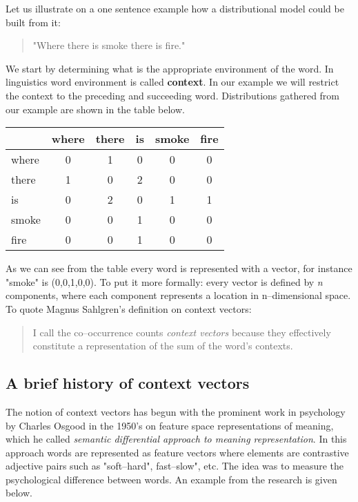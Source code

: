 Let us illustrate on a one sentence example how a distributional model could be built from it: 
\begin{quotation}
"Where there is smoke there is fire."
\end{quotation}
We start by determining what is the appropriate environment of the word. In linguistics word environment is called \textbf{context}. In our example we will restrict the context to the preceding and succeeding word. Distributions gathered from our example are shown in the table below. 
\\
\begin{center}
\begin{tabular}{ l | c c c c c }
   &  where & there & is & smoke & fire\\
  \hline                       
  where & 0 & 1 & 0 & 0 & 0 \\
  there & 1 & 0 & 2 &  0 & 0 \\
  is & 0 & 2 & 0 & 1 & 1 \\
  smoke & 0 & 0 & 1 & 0 & 0 \\
  fire & 0 & 0 & 1 & 0 & 0 \\
\end{tabular}
\end{center}
As we can see from the table every word is represented with a vector, for instance "smoke" is (0,0,1,0,0). To put it more formally: every vector is defined by \textit{n} components, where each component represents a location in n--dimensional space. To quote Magnus Sahlgren's definition on context vectors:
\begin{quotation}
I call the co--occurrence counts \textit{context vectors} because they effectively constitute a representation of the sum of the word's contexts.
\end{quotation} 

\subsection{A brief history of context vectors}
The notion of context vectors has begun with the prominent work in psychology by Charles Osgood in the 1950's on feature space representations of meaning, which he called \textit{semantic differential approach to meaning representation}. In this approach words are represented as feature vectors where elements are contrastive adjective pairs such as "soft--hard", fast--slow", etc. The idea was to measure the psychological difference between words. An example from the research is given below. 


